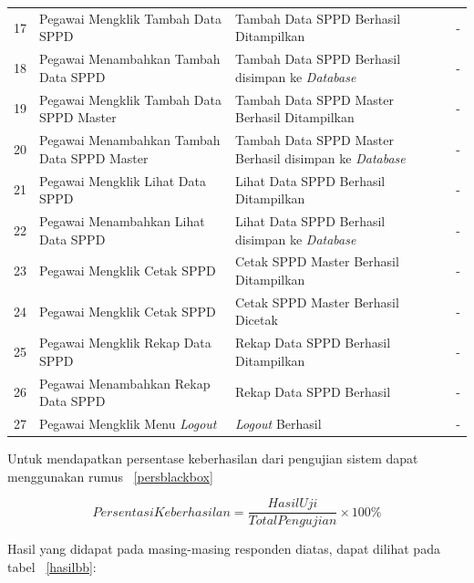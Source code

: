 \begin{enumerate}
{\begin{longtable}{p{0.5cm} p{4cm} p{4cm} p{0.5cm} p{1cm}}
			17 & Pegawai Mengklik Tambah Data SPPD & Tambah Data SPPD Berhasil Ditampilkan  & \checkmark & -\\
			18 & Pegawai Menambahkan Tambah Data SPPD & Tambah Data SPPD Berhasil disimpan ke \textit{Database}  & \checkmark & -\\
			19 & Pegawai Mengklik Tambah Data SPPD Master & Tambah Data SPPD Master Berhasil Ditampilkan  & \checkmark & -\\
			20 & Pegawai Menambahkan Tambah Data SPPD Master & Tambah Data SPPD Master Berhasil disimpan ke \textit{Database}  & \checkmark & -\\
			21 & Pegawai Mengklik Lihat Data SPPD & Lihat Data SPPD Berhasil Ditampilkan  & \checkmark & -\\
			22 & Pegawai Menambahkan Lihat Data SPPD & Lihat Data SPPD Berhasil disimpan ke \textit{Database}  & \checkmark & -\\
			23 & Pegawai Mengklik Cetak SPPD & Cetak SPPD Master Berhasil Ditampilkan  & \checkmark & -\\
			24 & Pegawai Mengklik Cetak SPPD & Cetak SPPD Master Berhasil Dicetak  & \checkmark & -\\		
			25 & Pegawai Mengklik Rekap Data SPPD & Rekap Data SPPD Berhasil Ditampilkan  & \checkmark & -\\
			26 & Pegawai Menambahkan Rekap Data SPPD & Rekap Data SPPD Berhasil  & \checkmark & -\\
			27 & Pegawai Mengklik Menu \textit{Logout} & \textit{Logout} Berhasil  & \checkmark & -\\\hline
			
	\end{longtable}}
	
\end{enumerate}
Untuk mendapatkan persentase keberhasilan dari pengujian sistem dapat menggunakan rumus \equ~\ref{persblackbox}

\begin{equation}
\label{persblackbox}
Persentasi Keberhasilan = \frac{HasilUji}{TotalPengujian} \times100\%
\end{equation}

Hasil yang didapat pada masing-masing responden diatas, dapat dilihat pada tabel \tab~\ref{hasilbb}:


